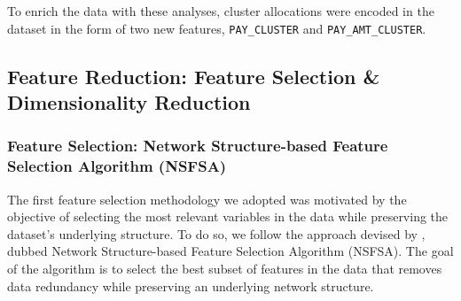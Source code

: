 \documentclass{article}
\newcommand{\code}{\texttt}
\begin{document}
To enrich the data with these analyses, cluster allocations were encoded in the dataset in the form of two new features, \code{PAY\_CLUSTER} and \code{PAY\_AMT\_CLUSTER}. 

\subsection{Feature Reduction: Feature Selection \& Dimensionality Reduction}

\subsubsection{Feature Selection: Network Structure-based Feature Selection Algorithm (NSFSA)}

The first feature selection methodology we adopted was motivated by the objective of selecting the most relevant variables in the data while preserving the dataset's underlying structure. To do so, we follow the approach devised by \citet{hu2019feature}, dubbed Network Structure-based Feature Selection Algorithm (NSFSA). The goal of the algorithm is to select the best subset of features in the data that removes data redundancy while preserving an underlying network structure.

\end{document}
